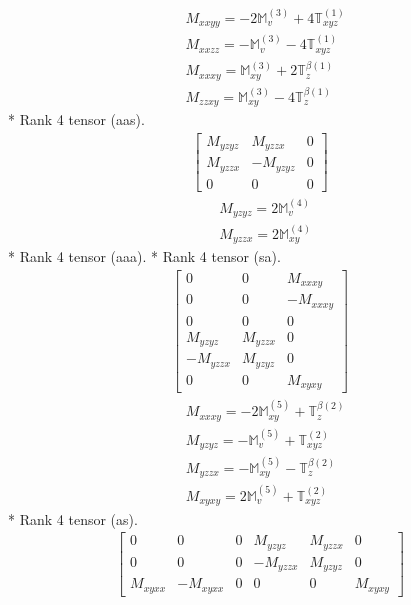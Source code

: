 \documentclass[fleqn,8pt,landscape]{jsarticle}
\begin{document}
\begin{align*}
& M_{xxyy} = - 2 \mathbb{M}_{v}^{(3)} + 4 \mathbb{T}_{xyz}^{(1)} \\
& M_{xxzz} = - \mathbb{M}_{v}^{(3)} - 4 \mathbb{T}_{xyz}^{(1)} \\
& M_{xxxy} = \mathbb{M}_{xy}^{(3)} + 2 \mathbb{T}_{z}^{\beta(1)} \\
& M_{zzxy} = \mathbb{M}_{xy}^{(3)} - 4 \mathbb{T}_{z}^{\beta(1)}
\end{align*}
* Rank 4 tensor (aas).
\begin{align*}
\begin{bmatrix} M_{yzyz} & M_{yzzx} & 0 \\ M_{yzzx} & - M_{yzyz} & 0 \\ 0 & 0 & 0 \end{bmatrix}
\end{align*}
\begin{align*}
& M_{yzyz} = 2 \mathbb{M}_{v}^{(4)} \\
& M_{yzzx} = 2 \mathbb{M}_{xy}^{(4)}
\end{align*}
* Rank 4 tensor (aaa).
* Rank 4 tensor (sa).
\begin{align*}
\begin{bmatrix} 0 & 0 & M_{xxxy} \\ 0 & 0 & - M_{xxxy} \\ 0 & 0 & 0 \\ M_{yzyz} & M_{yzzx} & 0 \\ - M_{yzzx} & M_{yzyz} & 0 \\ 0 & 0 & M_{xyxy} \end{bmatrix}
\end{align*}
\begin{align*}
& M_{xxxy} = - 2 \mathbb{M}_{xy}^{(5)} + \mathbb{T}_{z}^{\beta(2)} \\
& M_{yzyz} = - \mathbb{M}_{v}^{(5)} + \mathbb{T}_{xyz}^{(2)} \\
& M_{yzzx} = - \mathbb{M}_{xy}^{(5)} - \mathbb{T}_{z}^{\beta(2)} \\
& M_{xyxy} = 2 \mathbb{M}_{v}^{(5)} + \mathbb{T}_{xyz}^{(2)}
\end{align*}
* Rank 4 tensor (as).
\begin{align*}
\begin{bmatrix} 0 & 0 & 0 & M_{yzyz} & M_{yzzx} & 0 \\ 0 & 0 & 0 & - M_{yzzx} & M_{yzyz} & 0 \\ M_{xyxx} & - M_{xyxx} & 0 & 0 & 0 & M_{xyxy} \end{bmatrix}
\end{align*}
\end{document}
